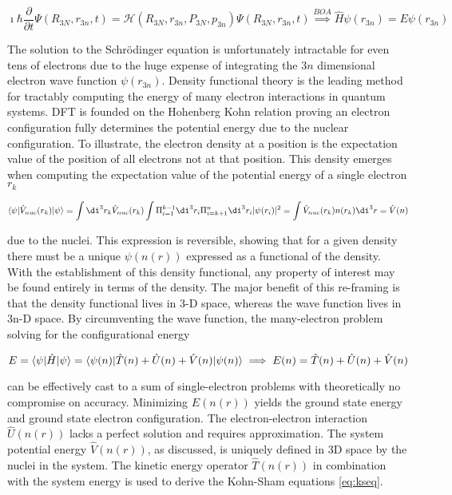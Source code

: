 \begin{equation}
\label{eq:scheq}
\imath\hbar\frac{\partial}{\partial t}\Psi(R_{3N}, r_{3n}, t) = \mathcal{H}(R_{3N}, r_{3n}, P_{3N}, p_{3n})\Psi(R_{3N}, r_{3n}, t) \stackrel{BOA}{\implies} \hat{H}\psi(r_{3n}) = E\psi(r_{3n})
\end{equation}

The solution to the Schrödinger equation is unfortunately intractable for even tens of electrons due to the huge expense of integrating the \(3n\) dimensional electron wave function \(\psi(r_{3n})\).
Density functional theory is the leading method for tractably computing the energy of many electron interactions in quantum systems.
DFT is founded on the Hohenberg Kohn relation proving an electron configuration fully determines the potential energy due to the nuclear configuration.
To illustrate, the electron density at a position is the expectation value of the position of all electrons not at that position.
This density emerges when computing the expectation value of the potential energy of a single electron \(r_k\)

\begin{equation}
\label{eq:V_ext}
\braket{\psi|\hat{V}_{nuc}(r_k)|\psi} = \int \di^3r_k \hat{V}_{nuc}(r_k)\int \Pi_{i=1}^{k-1}\di^3r_i\Pi_{i=k+1}^{n}\di^3r_i|\psi({r_i})|^2 = \int \hat{V}_{nuc}(r_k)n(r_k)\di^3r = \hat{V}(n)
\end{equation}

due to the nuclei.
This expression is reversible, showing that for a given density there must be a unique \(\psi(n(r))\) expressed as a functional of the density.
With the establishment of this density functional, any property of interest may be found entirely in terms of the density.
The major benefit of this re-framing is that the density functional lives in 3-D space, whereas the wave function lives in 3n-D space.
By circumventing the wave function, the many-electron problem solving for the configurational energy

\begin{equation}
\label{eq:funco}
E = \braket{\psi|\hat{H}|\psi} = \braket{\psi(n)|\hat{T}(n) + \hat{U}(n) + \hat{V}(n)|\psi(n)} \implies E(n) = \hat{T}(n) + \hat{U}(n) + \hat{V}(n)
\end{equation}

can be effectively cast to a sum of single-electron problems with theoretically no compromise on accuracy.
Minimizing \(E(n(r))\) yields the ground state energy and ground state electron configuration.
The electron-electron interaction \(\hat{U}(n(r))\) lacks a perfect solution and requires approximation.
The system potential energy \(\hat{V}(n(r))\), as discussed, is uniquely defined in 3D space by the nuclei in the system.
The kinetic energy operator \(\hat{T}(n(r))\) in combination with the system energy is used to derive the Kohn-Sham equations \eqref{eq:kseq}.


